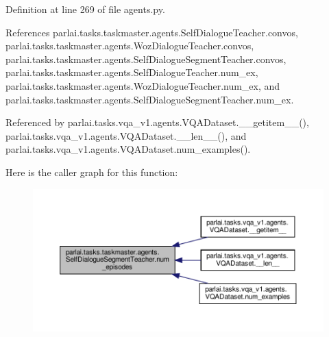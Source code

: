 Definition at line 269 of file agents.\+py.



References parlai.\+tasks.\+taskmaster.\+agents.\+Self\+Dialogue\+Teacher.\+convos, parlai.\+tasks.\+taskmaster.\+agents.\+Woz\+Dialogue\+Teacher.\+convos, parlai.\+tasks.\+taskmaster.\+agents.\+Self\+Dialogue\+Segment\+Teacher.\+convos, parlai.\+tasks.\+taskmaster.\+agents.\+Self\+Dialogue\+Teacher.\+num\+\_\+ex, parlai.\+tasks.\+taskmaster.\+agents.\+Woz\+Dialogue\+Teacher.\+num\+\_\+ex, and parlai.\+tasks.\+taskmaster.\+agents.\+Self\+Dialogue\+Segment\+Teacher.\+num\+\_\+ex.



Referenced by parlai.\+tasks.\+vqa\+\_\+v1.\+agents.\+V\+Q\+A\+Dataset.\+\_\+\+\_\+getitem\+\_\+\+\_\+(), parlai.\+tasks.\+vqa\+\_\+v1.\+agents.\+V\+Q\+A\+Dataset.\+\_\+\+\_\+len\+\_\+\+\_\+(), and parlai.\+tasks.\+vqa\+\_\+v1.\+agents.\+V\+Q\+A\+Dataset.\+num\+\_\+examples().

Here is the caller graph for this function\+:
\nopagebreak
\begin{figure}[H]
\begin{center}
\leavevmode
\includegraphics[width=350pt]{classparlai_1_1tasks_1_1taskmaster_1_1agents_1_1SelfDialogueSegmentTeacher_ac6074b82541ad78c9a4306877aff0764_icgraph}
\end{center}
\end{figure}
\mbox{\label{classparlai_1_1tasks_1_1taskmaster_1_1agents_1_1SelfDialogueSegmentTeacher_a587f3fcfacc5a44c81b4b083f61a0fad}} 
